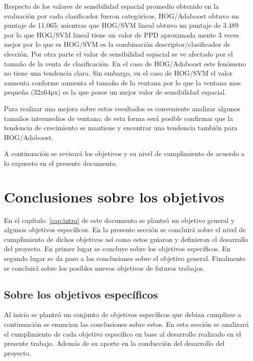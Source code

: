 Respecto de los valores de sensibilidad espacial promedio obtenido en la evaluación por cada clasificador fueron categóricos, HOG/Adaboost obtuvo un puntaje de 11.065; mientras que HOG/SVM lineal obtuvo un puntaje de 3.489 por lo que HOG/SVM lineal tiene un valor de PPD aproximada mente 3 veces mejor por lo que es HOG/SVM es la combinación descriptor/clasificador de elección. Por otra parte el valor de sensibilidad espacial se ve afectado por el tamaño de la venta de clasificación. En el caso de HOG/Adaboost este fenómeno no tiene una tendencia clara. Sin embargo, en el caso de HOG/SVM el valor aumenta conforme aumenta el tamaño de la ventana por lo que la ventana mas pequeña (32x64px) es la que posee un mejor valor de sensibilidad espacial.
 

Para realizar una mejora sobre estos resultados es conveniente analizar algunos tamaños intermedios de ventana; de esta forma será posible confirmar que la tendencia de crecimiento se mantiene y encontrar una tendencia también para HOG/Adaboost.

A continuación se revisará los objetivos y su nivel de cumplimiento de acuerdo a lo expuesto en el presente documento.

\section{Conclusiones sobre los objetivos}

En el capítulo~\ref{cap:intro} de este documento se planteó un objetivo general y  algunos objetivos específicos. En la presente sección se concluirá sobre el nivel de cumplimiento de dichos objetivos así como estos guiaron y definieron el desarrollo del proyecto. En primer lugar se concluye sobre los objetivos específicos. En segundo lugar se da paso a las conclusiones sobre el objetivo general. Finalmente se concluirá sobre los posibles nuevos objetivos de futuros trabajos.


\subsection{Sobre los objetivos específicos}

Al inicio se planteó un conjunto de objetivos específicos que debían cumplirse a continuación se enuncian las conclusiones sobre estos. En esta sección se analizará el cumplimiento de cada objetivo especifico en base al desarrollo realizado en el presente trabajo. Además de su aporte en la conducción del desarrollo del proyecto.


